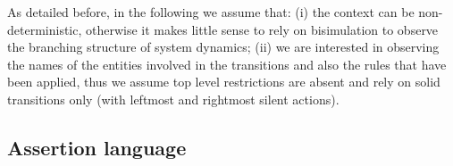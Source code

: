 As detailed before, in the following we assume that: (i) the context can be non-deterministic, otherwise it makes little sense to rely on bisimulation to observe the branching structure of system dynamics; (ii) we are interested in observing the names of the entities involved in the transitions and also the rules that have been applied, thus we assume top level restrictions are absent and rely on solid transitions only (with leftmost and rightmost silent actions).

\subsection{Assertion language}

%
%
%

